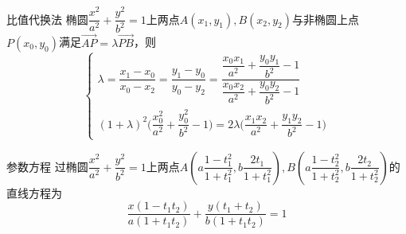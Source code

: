 \begin{solution}
    
\end{solution}
\begin{conclusion}{比值代换法}{}
\noindent 椭圆$\dfrac{x^2}{a^2}+\dfrac{y^2}{b^2}=1$上两点$A(x_1,y_1),B(x_2,y_2)$与非椭圆上点$P(x_0,y_0)$满足$\overrightarrow{AP}=\lambda\overrightarrow{PB}$，则
\[\begin{cases}\lambda=\dfrac{x_1-x_0}{x_0-x_2}=\dfrac{y_1-y_0}{y_0-y_2}=\dfrac{\dfrac{x_0x_1}{a^2}+\dfrac{y_0y_1}{b^2}-1}{\dfrac{x_0x_2}{a^2}+\dfrac{y_0y_2}{b^2}-1}\\(1+\lambda)^2\bigg(\dfrac{x_0^2}{a^2}+\dfrac{y_0^2}{b^2}-1\bigg)=2\lambda\bigg(\dfrac{x_1x_2}{a^2}+\dfrac{y_1y_2}{b^2}-1\bigg)\end{cases}\]
\end{conclusion}
\begin{myproof}
\end{myproof}
\begin{conclusion}{参数方程}{}
    过椭圆$\dfrac{x^2}{a^2}+\dfrac{y^2}{b^2}=1$上两点$A\left(a\dfrac{1-t_1^2}{1+t_1^2},b\dfrac{2t_1}{1+t_1^2}\right),B\left(a\dfrac{1-t_2^2}{1+t_2^2},b\dfrac{2t_2}{1+t_2^2}\right)$的直线方程为\[\dfrac{x(1-t_1t_2)}{a(1+t_1t_2)}+\dfrac{y(t_1+t_2)}{b(1+t_1t_2)}=1\]
\end{conclusion}
